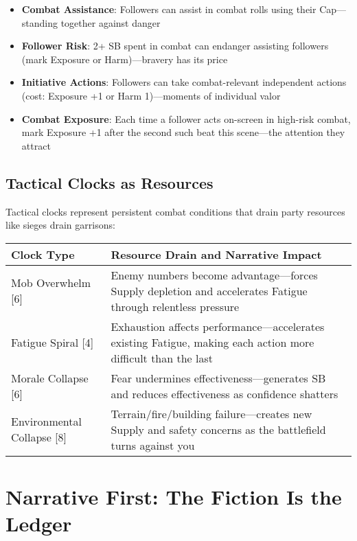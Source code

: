 \begin{itemize}
    \item \textbf{Combat Assistance}: Followers can assist in combat rolls using their Cap—standing together against danger
    \item \textbf{Follower Risk}: 2+ SB spent in combat can endanger assisting followers (mark Exposure or Harm)—bravery has its price
    \item \textbf{Initiative Actions}: Followers can take combat-relevant independent actions (cost: Exposure +1 or Harm 1)—moments of individual valor
    \item \textbf{Combat Exposure}: Each time a follower acts on-screen in high-risk combat, mark Exposure +1 after the second such beat this scene—the attention they attract
\end{itemize}

\subsection*{Tactical Clocks as Resources}

Tactical clocks represent persistent combat conditions that drain party resources like sieges drain garrisons:

\begin{fatebox}
\begin{tabularx}{\textwidth}{lX}
\toprule
\textbf{Clock Type} & \textbf{Resource Drain and Narrative Impact} \\
\midrule
Mob Overwhelm [6] & Enemy numbers become advantage—forces Supply depletion and accelerates Fatigue through relentless pressure \\
Fatigue Spiral [4] & Exhaustion affects performance—accelerates existing Fatigue, making each action more difficult than the last \\
Morale Collapse [6] & Fear undermines effectiveness—generates SB and reduces effectiveness as confidence shatters \\
Environmental Collapse [8] & Terrain/fire/building failure—creates new Supply and safety concerns as the battlefield turns against you \\
\bottomrule
\end{tabularx}
\end{fatebox}

\section*{Narrative First: The Fiction Is the Ledger}

